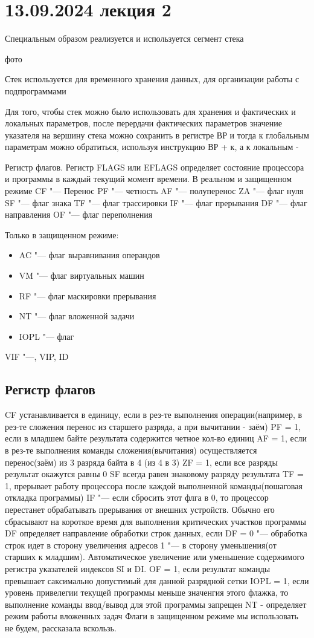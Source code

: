 \section{13.09.2024 лекция 2}
Специальным образом реализуется и используется сегмент стека


фото

Стек используется для временного хранения данных, для организации работы с подпрограммами

Для того, чтобы стек можно было использовать для хранения и фактических и локальных параметров, после перердачи фактических параметров значение указателя на вершину стека можно сохранить в регистре ВР и тогда к глобальным параметрам можно обратиться, используя инструкцию ВР + к, а к локальным - 

Регистр флагов. Регистр FLAGS или EFLAGS определяет состояние процессора и программы в каждый текущий момент времени.
В реальном и защищенном режиме
CF "--- Перенос
PF "--- четность
AF "--- полуперенос
ZA "--- флаг нуля
SF "--- флаг знака
TF "--- флаг трассировки
IF "--- флаг прерывания
DF "--- флаг направления
OF "--- флаг переполнения

Только в защищенном режиме:
\begin{itemize} 
    \item AC "--- флаг выравнивания операндов
    \item VM "--- флаг виртуальных машин
    \item RF "--- флаг маскировки прерывания
    \item NT "--- флаг вложенной задачи
    \item IOPL "--- флаг
\end{itemize}
VIF "---, VIP, ID

\subsection{Регистр флагов}
CF устанавливается в единицу, если в рез-те выполнения операции(например, в рез-те сложения перенос из старшего разряда, а при вычитании - заём)
PF = 1, если в младшем байте результата содержится четное кол-во единиц
AF = 1, если в рез-те выполнения команды сложения(вычитания) осуществляется перенос(заём) из 3 разряда байта в 4 (из 4 в 3)
ZF = 1, если все разряды результат окажутся равны 0
SF всегда равен знаковому разряду результата
TF = 1, прерывает работу процессора после каждой выполненной команды(пошаговая откладка программы)
IF "--- если сбросить этот флга в 0, то процессор перестанет обрабатывать прерывания от внешних устройств. Обычно его сбрасывают на короткое время для выполнения критических участков программы
DF определяет направление обработки строк данных, если DF = 0 "--- обработка строк идет в сторону увеличения адресов 1 "--- в сторону уменьшения(от старших к младшим). Автоматическое увеличение или уменьшение содержимого регистра указателей индексов SI и DI.
OF = 1, если результат команды превышает саксимально допустимый для данной разрядной сетки
IOPL = 1, если уровень привелегии текущей программы меньше значенгия этого флажка, то выполнение команды ввод/вывод для этой программы запрещен
NT - определяет режим работы вложенных задач
Флаги в защищенном режиме мы использовать не будем, рассказала вскользь.
